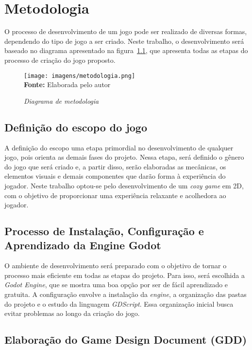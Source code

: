 \chapter{Metodologia}
\label{cap:03}

O processo de desenvolvimento de um jogo pode ser realizado de diversas formas, dependendo do tipo de jogo a ser criado. Neste trabalho, o desenvolvimento será baseado no diagrama apresentado na figura~\ref{fig:metodologia}, que apresenta todas as etapas do processo de criação do jogo proposto.

\FloatBarrier 
\begin{figure}[!htbp]
	\centering
	\caption{\textit{Diagrama de metodologia}}
	\texttt{[image: imagens/metodologia.png]}
	\\\textbf{Fonte:} Elaborada pelo autor
	\label{fig:metodologia}
\end{figure}
\FloatBarrier


\section{Definição do escopo do jogo}

A definição do escopo uma etapa primordial no desenvolvimento de qualquer jogo, pois orienta as demais fases do projeto. Nessa etapa, será definido o gênero do jogo que será criado e, a partir disso, serão elaboradas as mecânicas, os elementos visuais e demais componentes que darão forma à experiência do jogador. Neste trabalho optou-se pelo desenvolvimento de um \textit{cozy game} em 2D, com o objetivo de proporcionar uma experiência relaxante e acolhedora ao jogador.	

\section{Processo de Instalação, Configuração e Aprendizado da Engine Godot}

O ambiente de desenvolvimento será preparado com o objetivo de tornar o processo mais eficiente em todas as etapas do projeto. Para isso, será escolhida a \textit{Godot Engine}, que se mostra uma boa opção por ser de fácil aprendizado e gratuita. A configuração envolve a instalação da \textit{engine}, a organização das pastas do projeto e o estudo da linguagem \textit{GDScript}. Essa organização inicial busca evitar problemas ao longo da criação do jogo.


\section{Elaboração do Game Design Document (GDD)}




